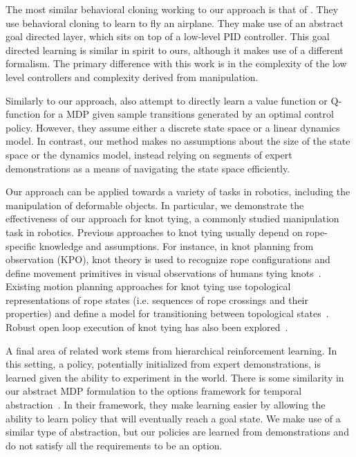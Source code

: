 The most similar behavioral cloning working to our approach is that of \citet{Isaac_ICML2003}.
They use behavioral cloning to learn to fly an airplane.
They make use of an abstract goal directed layer, which sits on top of a low-level PID controller.
This goal directed learning is similar in spirit to ours, although it makes use of a different formalism.
The primary difference with this work is in the complexity of the low level controllers and complexity derived from manipulation.

Similarly to our approach, \citet{Dvijotham_ICML2010} also attempt to directly
learn a value function or Q-function for a MDP given sample transitions
generated by an optimal control policy. However, they assume either a discrete
state space or a linear dynamics model. In contrast, our method makes no
assumptions about the size of the state space or the dynamics model, instead
relying on segments of expert demonstrations as a means of navigating the state
space efficiently. 

Our approach can be applied towards a variety of tasks in robotics,
including the manipulation of deformable objects.
In particular, we demonstrate the effectiveness of our approach for
knot tying, a commonly studied manipulation task in robotics.
Previous approaches to knot tying usually depend on rope-specific knowledge
and assumptions.
For instance, in knot planning from observation (KPO), knot theory is used
to recognize rope configurations and define movement primitives in visual
observations of humans tying knots~\cite{Morita_ICRA2003, Takamatsu_TransRob2006}.
Existing motion planning approaches for knot tying use topological
representations of rope states (i.e. sequences of rope crossings and their
properties) and define a model for transitioning between topological states~\cite{Saha_ExpRobotics2008, Wakamatsu_IJRR2006}.
Robust open loop execution of knot tying has also been explored~\cite{Bell_PhD2010}.

A final area of related work stems from hierarchical reinforcement learning. 
In this setting, a policy, potentially initialized from expert demonstrations, is learned given the ability to experiment in the world.
There is some similarity in our abstract MDP formulation to the options framework for temporal abstraction~\cite{sutton1999between}.
In their framework, they make learning easier by allowing the ability to learn policy that will eventually reach a goal state.
We make use of a similar type of abstraction, but our policies are learned from demonstrations and do not satisfy all the requirements to be an option.

